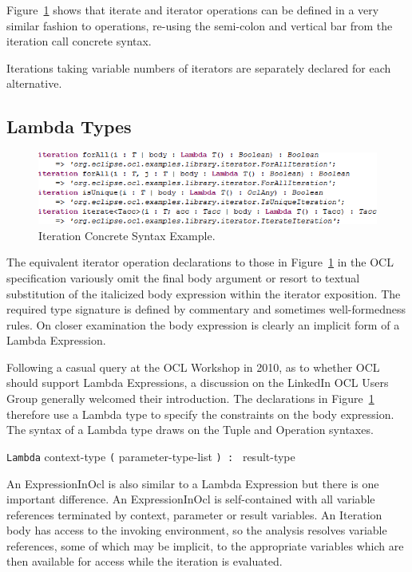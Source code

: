 \documentclass{eceasst}
\begin{document}
Figure~\ref{fig:IterationExample} shows that iterate and iterator operations can be defined in a very similar fashion to operations, re-using the semi-colon and vertical bar from the iteration call concrete syntax. 

Iterations taking variable numbers of iterators are separately declared for each alternative.

\subsection{Lambda Types}

\begin{figure}
  \begin{center}
    \includegraphics[width=5.0in]{IterationExample.png}
  \end{center}
  \caption{Iteration Concrete Syntax Example.}
  \label{fig:IterationExample}
\end{figure}

The equivalent iterator operation declarations to those in Figure~\ref{fig:IterationExample} in the OCL specification variously omit the final body argument or resort to textual substitution of the italicized body expression within the iterator exposition. The required type signature is defined by commentary and sometimes well-formedness rules. On closer examination the body expression is clearly an implicit form of a Lambda Expression.

Following a casual query at the OCL Workshop in 2010, as to whether OCL should support Lambda Expressions, a discussion on the LinkedIn OCL Users Group\cite{LinkedIn} generally welcomed their introduction. The declarations in Figure~\ref{fig:IterationExample} therefore use a Lambda type to specify the constraints on the body expression. The syntax of a Lambda type draws on the Tuple and Operation syntaxes.

\verb|Lambda| context-type \verb|(| parameter-type-list \verb|) : | result-type

An ExpressionInOcl is also similar to a Lambda Expression but there is one important difference. An ExpressionInOcl is self-contained with all variable references terminated by context, parameter or result variables. An Iteration body has access to the invoking environment, so the analysis resolves variable references, some of which may be implicit, to the appropriate variables which are then available for access while the iteration is evaluated.
\end{document}
